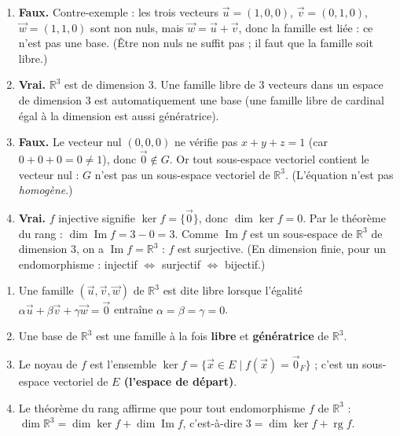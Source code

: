 \documentclass[11pt]{article}
\newcommand{\cle}[1]{{\popxbold\color{popdark}#1}}
\begin{document}
\begin{corrige}
\begin{enumerate}
\item \textbf{Faux.} Contre-exemple : les trois vecteurs $\vec{u} = (1,0,0)$, $\vec{v} = (0,1,0)$, $\vec{w} = (1,1,0)$ sont non nuls, mais $\vec{w} = \vec{u} + \vec{v}$, donc la famille est liée : ce n'est pas une base. (Être non nuls ne suffit pas ; il faut que la famille soit libre.)
\item \textbf{Vrai.} $\mathbb{R}^3$ est de dimension $3$. Une famille libre de $3$ vecteurs dans un espace de dimension $3$ est automatiquement une base (une famille libre de cardinal égal à la dimension est aussi génératrice).
\item \textbf{Faux.} Le vecteur nul $(0,0,0)$ ne vérifie pas $x + y + z = 1$ (car $0 + 0 + 0 = 0 \neq 1$), donc $\vec{0} \notin G$. Or tout sous-espace vectoriel contient le vecteur nul : $G$ n'est pas un sous-espace vectoriel de $\mathbb{R}^3$. (L'équation n'est pas \emph{homogène}.)
\item \textbf{Vrai.} $f$ injective signifie $\ker f = \{\vec{0}\}$, donc $\dim \ker f = 0$. Par le théorème du rang : $\dim \operatorname{Im} f = 3 - 0 = 3$. Comme $\operatorname{Im} f$ est un sous-espace de $\mathbb{R}^3$ de dimension $3$, on a $\operatorname{Im} f = \mathbb{R}^3$ : $f$ est surjective. (En dimension finie, pour un endomorphisme : injectif $\iff$ surjectif $\iff$ bijectif.)
\end{enumerate}
\end{corrige}

\begin{corrige}
\begin{enumerate}
\item Une famille $(\vec{u}, \vec{v}, \vec{w})$ de $\mathbb{R}^3$ est dite \cle{libre} lorsque l'égalité $\alpha \vec{u} + \beta \vec{v} + \gamma \vec{w} = \vec{0}$ entraîne \textbf{$\alpha = \beta = \gamma = 0$}.
\item Une \cle{base} de $\mathbb{R}^3$ est une famille à la fois \textbf{libre} et \textbf{génératrice} de $\mathbb{R}^3$.
\item Le \cle{noyau} de $f$ est l'ensemble $\ker f = \{\vec{x} \in E \mid f(\vec{x}) = \vec{0}_F\}$ ; c'est un sous-espace vectoriel de \textbf{$E$ (l'espace de départ)}.
\item Le théorème du rang affirme que pour tout endomorphisme $f$ de $\mathbb{R}^3$ : $\dim \mathbb{R}^3 = \dim \ker f + \dim \operatorname{Im} f$, c'est-à-dire $3 = \dim \ker f + \operatorname{rg} f$.
\end{enumerate}
\end{corrige}
\end{document}
